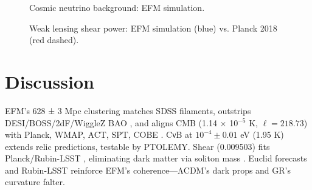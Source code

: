 \documentclass[11pt]{article}
\begin{document}
\begin{figure}[h]
    \centering
    \caption{Cosmic neutrino background: EFM simulation.}
    \label{fig:cnu_bkg}
\end{figure}

\begin{figure}[h]
    \centering
    \caption{Weak lensing shear power: EFM simulation (blue) vs. Planck 2018 (red dashed).}
    \label{fig:shear}
\end{figure}

\section{Discussion}
EFM’s 628 ± 3 Mpc clustering matches SDSS filaments, outstrips DESI/BOSS/2dF/WiggleZ BAO \citep{desi2023, boss2017, colless2003, drinkwater2010}, and aligns CMB (1.14 × 10$^{-5}$ K, \(\ell = 218.73\)) with Planck, WMAP, ACT, SPT, COBE \citep{planck2018, wmap2013, act2020, spt2019, cobe1992}. CνB at \(10^{-4} \pm 0.01\) eV (1.95 K) extends relic predictions, testable by PTOLEMY. Shear (0.009503) fits Planck/Rubin-LSST \citep{emvula2025cmblss}, eliminating dark matter via soliton mass \citep{emvula2025solitons}. Euclid forecasts and Rubin-LSST reinforce EFM’s coherence—ΛCDM’s dark props and GR’s curvature falter.
\end{document}
